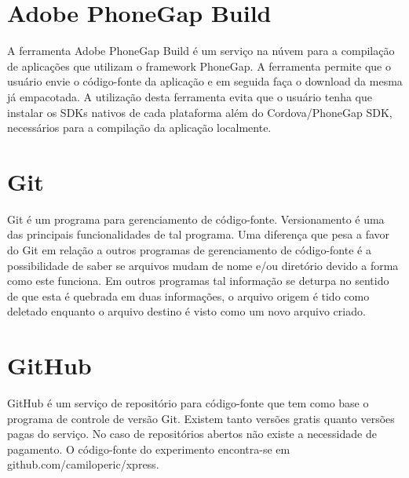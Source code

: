 \section{Adobe PhoneGap Build}
A ferramenta Adobe PhoneGap Build é um serviço na núvem para a compilação de aplicações que utilizam o framework PhoneGap. A ferramenta permite que o usuário envie o código-fonte da aplicação e em seguida faça o download da mesma já empacotada. A utilização desta ferramenta evita que o usuário tenha que instalar os SDKs nativos de cada plataforma além do Cordova/PhoneGap SDK, necessários para a compilação da aplicação localmente.

\section{Git}
Git é um programa para gerenciamento de código-fonte. Versionamento é uma das principais funcionalidades de tal programa. Uma diferença que pesa a favor do Git em relação a outros programas de gerenciamento de  código-fonte é a possibilidade de saber se arquivos mudam de nome e/ou diretório devido a forma como este funciona. Em outros programas tal informação se deturpa no sentido de que esta é quebrada em duas informações, o arquivo origem é tido como deletado enquanto o arquivo destino é visto como um novo arquivo criado.

\section{GitHub}
GitHub é um serviço de repositório para código-fonte que tem como base o programa de controle de versão Git. Existem tanto versões gratis quanto versões pagas do serviço. No caso de repositórios abertos não existe a necessidade de pagamento. O código-fonte do experimento encontra-se em github.com/camiloperic/xpress.

